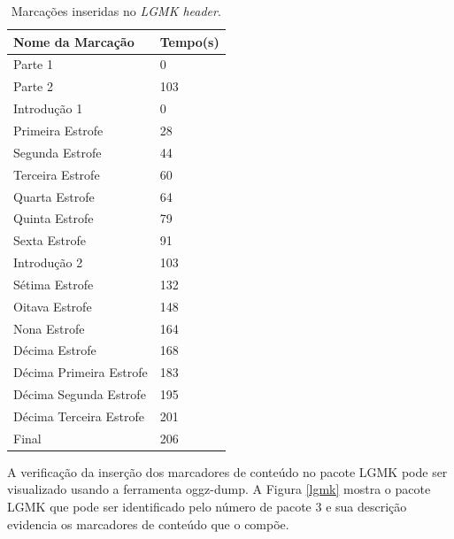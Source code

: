 \begin{table}[ht]
\centering
\caption{Marcações inseridas no \textit{LGMK header}.}
\vspace{0.5cm}
\begin{tabular}{ll}

\hline
\textbf{Nome da Marcação} & \textbf{Tempo(s)} \\
\hline
Parte 1 & 0 \\
Parte 2 & 103 \\
Introdução 1 & 0 \\
Primeira Estrofe & 28 \\
Segunda Estrofe & 44 \\
Terceira Estrofe & 60 \\
Quarta Estrofe & 64 \\
Quinta Estrofe & 79 \\
Sexta Estrofe & 91 \\
Introdução 2 & 103 \\
Sétima Estrofe & 132 \\
Oitava Estrofe & 148 \\
Nona Estrofe & 164 \\
Décima Estrofe & 168 \\
Décima Primeira Estrofe & 183 \\
Décima Segunda Estrofe & 195 \\
Décima Terceira Estrofe & 201 \\
Final & 206 \\
\hline

\end{tabular}
\label{mark}
\end{table}

A verificação da inserção dos marcadores de conteúdo no pacote LGMK pode ser visualizado usando a ferramenta oggz-dump. A Figura \ref{lgmk} mostra o pacote LGMK que pode ser identificado pelo número de pacote 3 e sua descrição evidencia os marcadores de conteúdo que o compõe.

